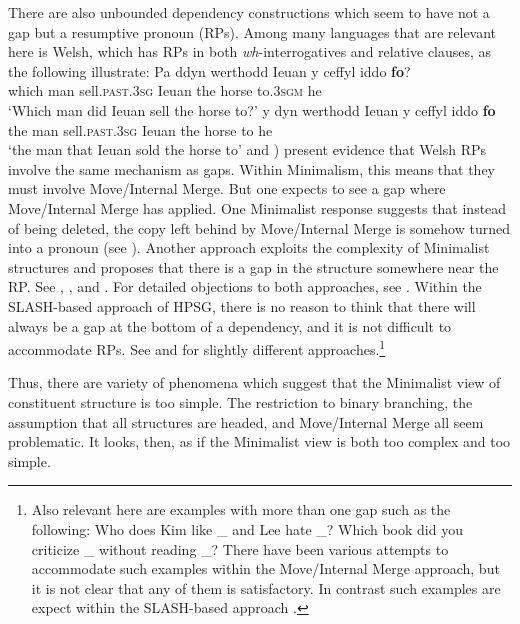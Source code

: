 \documentclass[output=paper]{langsci/langscibook}
\begin{document}
There are also unbounded dependency constructions which seem to have not a gap but a resumptive pronoun (RPs). Among many languages that are relevant here is Welsh, which has RPs in both \textit{wh}-interrogatives and relative clauses, as the following illustrate:
\eal
\ex
\gll Pa	ddyn werthodd Ieuan y ceffyl iddo \textbf{fo}?\\
which man sell.\textsc{past}.\textsc{3sg} Ieuan the horse to.\textsc{3sgm} he\\
\glt`Which man did Ieuan sell the horse to?'
\ex 
\gll y dyn werthodd Ieuan y ceffyl iddo \textbf{fo}\\
the man sell.\textsc{past}.\textsc{3sg} Ieuan the horse to he\\
\glt`the man that Ieuan sold the horse to'
\zl
\citet{Willis.2011} and \citet{Borsley.2010,Borsley2013a-u}) present evidence that Welsh RPs involve the same mechanism as gaps. Within Minimalism, this means that they must involve Move/Internal Merge. But one expects to see a gap where Move/Internal Merge has applied. One Minimalist response suggests that instead of being deleted, the copy left behind by Move/Internal Merge is somehow turned into a pronoun (see \citealt{McCloskey.2006}). Another approach exploits the complexity of Minimalist structures and proposes that there is a gap in the structure somewhere near the RP. See \citet{Willis.2011}, \citet{AounChoueiriHornstein2001a-u}, and \citet{Boeckx.2003}. For detailed objections to both approaches, see \citet[section~3]{Borsley2013a-u}. Within the SLASH-based approach of HPSG, there is no reason to think that there will always be a gap at the bottom of a dependency, and it is not difficult to accommodate RPs. See \citet{Borsley2013a-u} and \citet{crysmann_b10fg,Crysmann.2016} for slightly different approaches.\footnote{%
	Also relevant here are examples with more than one gap such as the following:
	\eal
	\ex	Who does Kim like \_ and Lee hate \_?
	\ex	Which book did you criticize \_ without reading \_?
	\zl
	There have been various attempts to accommodate such examples within the Move/Internal Merge approach, but it is not clear that any of them is satisfactory. In contrast such examples are expect within the SLASH-based approach \citet{LS2003a-u}.%
}

Thus, there are variety of phenomena which suggest that the Minimalist view of constituent structure is too simple. The restriction to binary branching, the assumption that all structures are headed, and Move/Internal Merge all seem problematic. It looks, then, as if the Minimalist view is both too complex and too simple.
\end{document}
